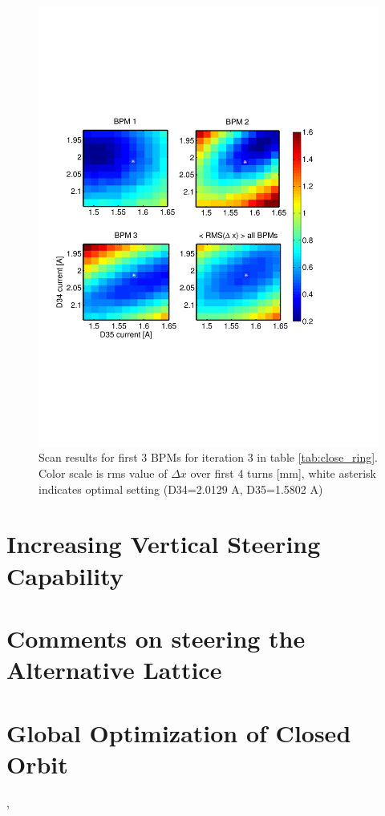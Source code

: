 \begin{figure}[htb]
\centering
\includegraphics[width=\textwidth,trim={0 2.7in 1in 2.7in},clip]{4.figures/closing_orbit_iteration3.pdf}
\caption{Scan results for first 3 BPMs for iteration 3 in table \ref{tab:close_ring}. Color scale is rms value of $\Delta x$ over first 4 turns [mm], white asterisk indicates optimal setting (D34=2.0129 A, D35=1.5802 A) }
\label{fig:close_scan}
\end{figure}



\section{Increasing Vertical Steering Capability} \label{sec:steering:vertical}






\section{Comments on steering the Alternative Lattice}



\section{Global Optimization of Closed Orbit}


\cite{Kirkpatrick2015} %
\cite{Huang2013}, \cite{LevonRCDS} %

